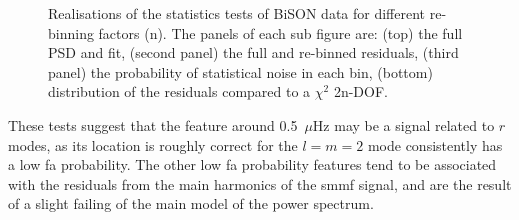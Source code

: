 \begin{figure}[!ht]
	\qquad
	
	\caption{Realisations of the statistics tests of BiSON data for different re-binning factors (n). The panels of each sub figure are: (top) the full PSD and fit, (second panel) the full and re-binned residuals, (third panel) the probability of statistical noise in each bin, (bottom) distribution of the residuals compared to a $\chi^2$ 2n-DOF.}
	\label{fig:BiSON_new_asymm_stats}
\end{figure}


These tests suggest that the feature around 0.5~$\mu$Hz may be a signal related to $r$ modes, as its location is roughly correct for the $l=m=2$ mode consistently has a low \gls{fa} probability. The other low \gls{fa} probability features tend to be associated with the residuals from the main harmonics of the \gls{smmf} signal, and are the result of a slight failing of the main model of the power spectrum.


